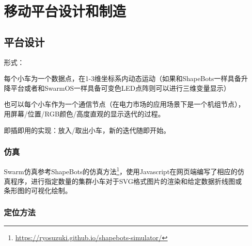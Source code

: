 \chapter{移动平台设计和制造}
\label{cha:Platform}

\section{平台设计}
形式：

每个小车为一个数据点，在1-3维坐标系内动态运动（如果和ShapeBots\cite{suzuki2019shapebots}一样具备升降平台或者和SwarmOS一样具备可变色LED点阵则可以进行三维变量显示）

也可以每个小车作为一个通信节点（在电力市场的应用场景下是一个机组节点），用屏幕/位置/RGB颜色/高度直观的显示迭代的过程。

即插即用的实现：放入/取出小车，新的迭代随即开始。

\subsection{仿真}

Swarm仿真参考ShapeBots\cite{suzuki2019shapebots}的仿真方法\footnote{\href{https://ryosuzuki.github.io/shapebots-simulator/}{https://ryosuzuki.github.io/shapebots-simulator/}}，使用Javascript在网页端编写了相应的仿真程序，进行指定数量的集群小车对于SVG格式图片的渲染和给定数据折线图或条形图的可视化绘制。

\subsection{定位方法}

%  

